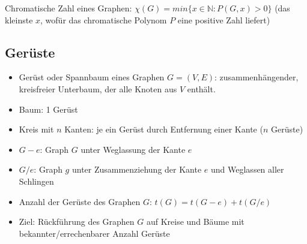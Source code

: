 Chromatische Zahl eines Graphen: $\chi(G) = {min}\{x \in \mathbb{N} : P(G,x) > 0\}$ (das kleinste $x$, wofür das chromatische Polynom $P$ eine positive Zahl liefert)

\subsection{Gerüste}

\begin{itemize}
    \item{Gerüst oder Spannbaum eines Graphen $G=(V,E)$: zusammenhängender, kreisfreier Unterbaum, der alle Knoten aus $V$ enthält.}
    \item{Baum: 1 Gerüst}
    \item{Kreis mit $n$ Kanten: je ein Gerüst durch Entfernung einer Kante ($n$ Gerüste)}
    \item{$G-e$: Graph $G$ unter Weglassung der Kante $e$}
    \item{$G/e$: Graph $g$ unter Zusammenziehung der Kante $e$ und Weglassen aller Schlingen}
    \item{Anzahl der Gerüste des Graphen $G$: $t(G)=t(G-e)+t(G/e)$}
    \item{Ziel: Rückführung des Graphen $G$ auf Kreise und Bäume mit bekannter/errechenbarer Anzahl Gerüste}
\end{itemize}
